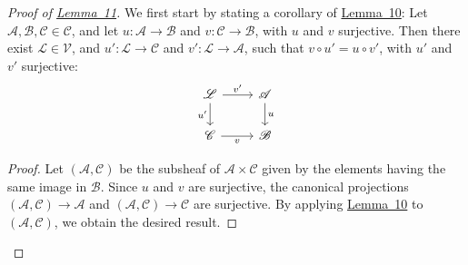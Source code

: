 \documentclass{article}
\theoremstyle{plain}
\newenvironment{lemma}[1]
    {\renewcommand\theinnerlemma{#1}\innerlemma}
    {\endinnerlemma}
\theoremstyle{definition}
\newcommand{\scr}[1]{{\mathscr{#1}}}
\renewcommand{\cal}[1]{{\mathcal{#1}}}
\begin{document}
\begin{proof}[Proof of {\hyperref[lemma11]{Lemma~11}}]
  We first start by stating a corollary of \hyperref[lemma10]{Lemma~10}:
  \begin{lemma}{13}
  \label{lemma13}
    Let $\scr{A},\scr{B},\scr{C}\in\cal{C}$, and let $u\colon\scr{A}\to\scr{B}$ and $v\colon\scr{C}\to\scr{B}$, with $u$ and $v$ surjective.
    Then there exist $\scr{L}\in\cal{V}$, and $u'\colon\scr{L}\to\scr{C}$ and $v'\colon\scr{L}\to\scr{A}$, such that $v\circ u'=u\circ v'$, with $u'$ and $v'$ surjective:
    \[
      \begin{tikzcd}
        \scr{L} \ar[r,"v'"] \ar[d,swap,"u'"]
        & \scr{A} \ar[d,"u"]
      \\\scr{C} \ar[r,swap,"v"]
        & \scr{B}
      \end{tikzcd}
    \]
  \end{lemma}

  \begin{proof}
    Let $(\scr{A},\scr{C})$ be the subsheaf of $\scr{A}\times\scr{C}$ given by the elements having the same image in $\scr{B}$.
    Since $u$ and $v$ are surjective, the canonical projections $(\scr{A},\scr{C})\to\scr{A}$ and $(\scr{A},\scr{C})\to\scr{C}$ are surjective.
    By applying \hyperref[lemma10]{Lemma~10} to $(\scr{A},\scr{C})$, we obtain the desired result.
  \end{proof}


\end{proof}
\end{document}
